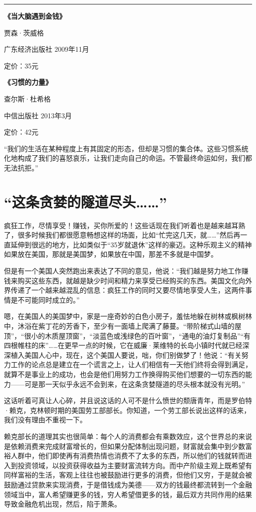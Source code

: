 \begin{center}\rule{3in}{0.4pt}\end{center}

\textbf{《当大脑遇到金钱》}

贾森·茨威格

广东经济出版社 2009年11月

定价：35元

\textbf{《习惯的力量》}

查尔斯·杜希格

中信出版社 2013年3月

定价：42元

``我们的生活在某种程度上有其固定的形态，但却是习惯的集合体。这些习惯系统化地构成了我们的喜怒哀乐，让我们走向自己的命运。不管最终命运如何，我们都无法抗拒。''

\section{``这条贪婪的隧道尽头\ldots{}\ldots{}''}

疯狂工作，尽情享受！赚钱，买你所爱的！这些话现在我们听着也是越来越耳熟了，很多时候我们都很愿意畅想这样的场面，比如``忙完这几天，就\ldots{}\ldots{}''然后再一直延伸到很远的地方，比如类似于``35岁就退休''这样的豪迈。这种乐观主义的精神如果放在美国，那就是美国梦，如果放在中国，那差不多就是中国梦。

但是有一个美国人突然跑出来表达了不同的意见，他说：``我们越是努力地工作赚钱来购买这些东西，就越是缺少时间和精力来享受已经购买的东西。美国文化向外界传递了一个越来越混乱的信息：疯狂工作的同时又要尽情地享受人生，这两件事情是不可能同时成立的。''

嗯，在美国人的美国梦中，家是一座奇妙的白色小房子，羞怯地躲在树林或枫树林中，沐浴在紫丁花的芳香下，至少有一面墙上爬满了藤蔓。``带阶梯式山墙的屋顶''，``很小的木质屋顶窗''，``淡蓝色或浅绿色的百叶窗''，``通电的油灯复制品''``有四根帷柱的床''\ldots{}\ldots{}在更早一点的时候，它在威廉·莱维特的长岛小镇时代就已经深深植入美国人心中，现在，这个美国人要说，咄，你们别做梦了！他说：``有关努力工作的论点总是建立在一个谎言之上，让人们相信有一天他们终将会得到满足，就算不是事业上的成功，也会是他们用努力工作换得购买他们想要的一切东西的能力------可是那一天似乎永远不会到来，在这条贪婪隧道的尽头根本就没有光明。''

这话听着可真让人心碎，并且说这话的人可不是什么愤世的颓唐青年，而是罗伯特·赖克，克林顿时期的美国劳工部部长。你知道，一个劳工部长说出这样的话来，我们没有理由不重视一下。

赖克部长的道理其实也很简单：每个人的消费都会有乘数效应，这个世界总的来说是依赖消费来完成财富增长的，但如果分配体制出现问题，财富就会集中到少数富裕人群中，他们即使再有消费热情也消费不了太多的东西，所以他们的钱就转而进入到投资领域，以投资获得收益为主要财富流转方向。而中产阶级主观上既希望有同样富裕的生活，客观上往往也被鼓励进行更多的消费，但他们又穷，于是就会被鼓励通过贷款来实现消费，于是借钱成为美德------双方的钱最终都流转到一个金融领域当中，富人希望赚更多的钱，穷人希望借更多的钱，最后双方共同作用的结果导致金融危机出现，然后，陷于萧条。

